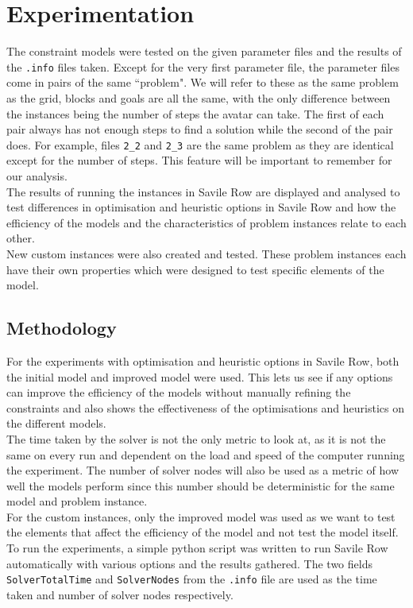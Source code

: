 \documentclass{article}
\newcommand{\n}[0]{\\[\baselineskip]}
\begin{document}
\section{Experimentation}
The constraint models were tested on the given parameter files and the results of the \texttt{.info} files taken. Except for the very first parameter file, the parameter files come in pairs of the same ``problem". We will refer to these as the same problem as the grid, blocks and goals are all the same, with the only difference between the instances being the number of steps the avatar can take. The first of each pair always has not enough steps to find a solution while the second of the pair does. For example, files \texttt{2\_2} and \texttt{2\_3} are the same problem as they are identical except for the number of steps. This feature will be important to remember for our analysis. 
\n
The results of running the instances in Savile Row are displayed and analysed to test differences in optimisation and heuristic options in Savile Row and how the efficiency of the models and the characteristics of problem instances relate to each other. 
\n
New custom instances were also created and tested. These problem instances each have their own properties which were designed to test specific elements of the model.


\subsection{Methodology}
For the experiments with optimisation and heuristic options in Savile Row, both the initial model and improved model were used. This lets us see if any options can improve the efficiency of the models without manually refining the constraints and also shows the effectiveness of the optimisations and heuristics on the different models.
\n
The time taken by the solver is not the only metric to look at, as it is not the same on every run and dependent on the load and speed of the computer running the experiment. The number of solver nodes will also be used as a metric of how well the models perform since this number should be deterministic for the same model and problem instance. 
\n
For the custom instances, only the improved model was used as we want to test the elements that affect the efficiency of the model and not test the model itself. 
\n
To run the experiments, a simple python script was written to run Savile Row automatically with various options and the results gathered. The two fields \texttt{SolverTotalTime} and \texttt{SolverNodes} from the \texttt{.info} file are used as the time taken and number of solver nodes respectively.
\end{document}
